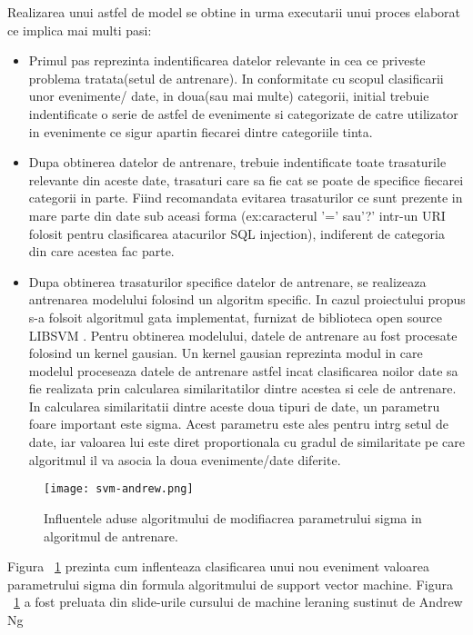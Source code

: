 Realizarea unui astfel de model se obtine in urma executarii unui proces elaborat ce implica mai multi pasi:
\begin{itemize}
	\item  Primul pas reprezinta indentificarea datelor relevante in cea ce priveste problema tratata(setul de antrenare). In conformitate cu scopul clasificarii unor evenimente/ date, in doua(sau mai multe) categorii, initial trebuie indentificate o serie de astfel de evenimente si categorizate de catre utilizator in evenimente ce sigur apartin fiecarei dintre categoriile tinta.
	\item Dupa  obtinerea datelor de antrenare, trebuie indentificate toate trasaturile relevante din aceste date, trasaturi care sa fie cat se poate de specifice fiecarei categorii in parte. Fiind recomandata evitarea trasaturilor ce sunt prezente in mare parte din date sub aceasi forma (ex:caracterul '=' sau'?' intr-un URI folosit pentru clasificarea atacurilor SQL injection), indiferent de categoria din care acestea fac parte.
	\item Dupa obtinerea trasaturilor specifice datelor de antrenare, se realizeaza antrenarea modelului folosind un algoritm specific. In cazul proiectului propus s-a folsoit algoritmul gata implementat, furnizat de biblioteca open source LIBSVM \cite{libsvm}. Pentru obtinerea modelului, datele de antrenare au fost procesate folosind un kernel gausian. Un kernel gausian reprezinta modul in care modelul proceseaza datele de antrenare astfel incat clasificarea noilor date sa fie realizata prin calcularea similaritatilor dintre acestea si cele de antrenare. In calcularea similaritatii dintre aceste doua tipuri de date, un parametru foare important este sigma. Acest parametru este ales pentru intrg setul de date, iar valoarea lui este diret proportionala cu gradul de similaritate pe care algoritmul il va asocia la doua evenimente/date diferite.
\end{itemize}



\begin{figure}[h]
	\centering
	\texttt{[image: svm-andrew.png]}
	\caption{Influentele aduse algoritmului de modifiacrea parametrului sigma in algoritmul de antrenare.}
	\label{fig:rev-proxy}
\end{figure}


Figura ~\ref{fig:rev-proxy} prezinta cum inflenteaza clasificarea unui nou eveniment valoarea parametrului sigma din formula algoritmului de support vector machine. Figura ~\ref{fig:rev-proxy} a fost preluata din slide-urile cursului de machine leraning sustinut de Andrew Ng \cite{andrew_ng} \\


